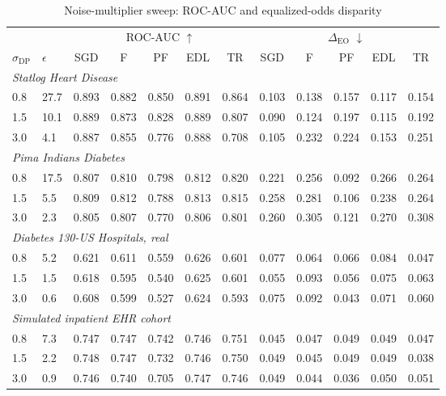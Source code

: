 \documentclass[pdflatex,sn-vancouver-num,referee,lineno]{sn-jnl}
\theoremstyle{thmstyleone}
\theoremstyle{thmstylethree}
\begin{document}
\begin{table}
\centering
\small
\caption{Noise-multiplier sweep: ROC-AUC and equalized-odds disparity}
\label{tab:sweep}
\begingroup\scriptsize\setlength{\tabcolsep}{2.5pt}
\begin{tabular}{llcccccccccc}
\toprule
 & & \multicolumn{5}{c}{ROC-AUC $\uparrow$} & \multicolumn{5}{c}{$\Delta_{\text{EO}}$ $\downarrow$} \\
\cmidrule(lr){3-7}\cmidrule(lr){8-12}
$\sigma_{\text{DP}}$ & $\epsilon$ & SGD & F & PF & EDL & TR & SGD & F & PF & EDL & TR \\
\midrule
\multicolumn{12}{l}{\emph{Statlog Heart Disease}} \\
0.8 & 27.7 & 0.893 & 0.882 & 0.850 & 0.891 & 0.864 & 0.103 & 0.138 & 0.157 & 0.117 & 0.154 \\
1.5 & 10.1 & 0.889 & 0.873 & 0.828 & 0.889 & 0.807 & 0.090 & 0.124 & 0.197 & 0.115 & 0.192 \\
3.0 & 4.1 & 0.887 & 0.855 & 0.776 & 0.888 & 0.708 & 0.105 & 0.232 & 0.224 & 0.153 & 0.251 \\
\midrule
\multicolumn{12}{l}{\emph{Pima Indians Diabetes}} \\
0.8 & 17.5 & 0.807 & 0.810 & 0.798 & 0.812 & 0.820 & 0.221 & 0.256 & 0.092 & 0.266 & 0.264 \\
1.5 & 5.5 & 0.809 & 0.812 & 0.788 & 0.813 & 0.815 & 0.258 & 0.281 & 0.106 & 0.238 & 0.264 \\
3.0 & 2.3 & 0.805 & 0.807 & 0.770 & 0.806 & 0.801 & 0.260 & 0.305 & 0.121 & 0.270 & 0.308 \\
\midrule
\multicolumn{12}{l}{\emph{Diabetes 130-US Hospitals, real}} \\
0.8 & 5.2 & 0.621 & 0.611 & 0.559 & 0.626 & 0.601 & 0.077 & 0.064 & 0.066 & 0.084 & 0.047 \\
1.5 & 1.5 & 0.618 & 0.595 & 0.540 & 0.625 & 0.601 & 0.055 & 0.093 & 0.056 & 0.075 & 0.063 \\
3.0 & 0.6 & 0.608 & 0.599 & 0.527 & 0.624 & 0.593 & 0.075 & 0.092 & 0.043 & 0.071 & 0.060 \\
\midrule
\multicolumn{12}{l}{\emph{Simulated inpatient EHR cohort}} \\
0.8 & 7.3 & 0.747 & 0.747 & 0.742 & 0.746 & 0.751 & 0.045 & 0.047 & 0.049 & 0.049 & 0.047 \\
1.5 & 2.2 & 0.748 & 0.747 & 0.732 & 0.746 & 0.750 & 0.049 & 0.045 & 0.049 & 0.049 & 0.038 \\
3.0 & 0.9 & 0.746 & 0.740 & 0.705 & 0.747 & 0.746 & 0.049 & 0.044 & 0.036 & 0.050 & 0.051 \\
\bottomrule
\end{tabular}
\endgroup
\par\vspace{3pt}
\end{table}
\end{document}
